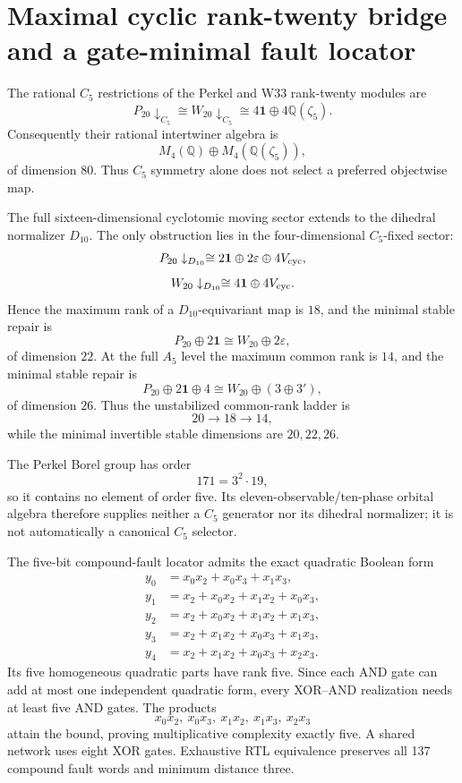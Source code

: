 \section{Maximal cyclic rank-twenty bridge and a gate-minimal fault locator}
\label{sec:bt3570-3576}

The rational $C_5$ restrictions of the Perkel and W33 rank-twenty modules are
\[
P_{20}\downarrow_{C_5}\cong W_{20}\downarrow_{C_5}
\cong4\mathbf1\oplus4\mathbb Q(\zeta_5).
\]
Consequently their rational intertwiner algebra is
\[
M_4(\mathbb Q)\oplus M_4(\mathbb Q(\zeta_5)),
\]
of dimension $80$.  Thus $C_5$ symmetry alone does not select a preferred
objectwise map.

The full sixteen-dimensional cyclotomic moving sector extends to the dihedral
normalizer $D_{10}$.  The only obstruction lies in the four-dimensional
$C_5$-fixed sector:
\[
P_{20}\downarrow_{D_{10}}\cong2\mathbf1\oplus2\varepsilon\oplus4V_{\rm cyc},
\]
\[
W_{20}\downarrow_{D_{10}}\cong4\mathbf1\oplus4V_{\rm cyc}.
\]
Hence the maximum rank of a $D_{10}$-equivariant map is $18$, and the minimal
stable repair is
\[
\boxed{P_{20}\oplus2\mathbf1\cong W_{20}\oplus2\varepsilon},
\]
of dimension $22$.  At the full $A_5$ level the maximum common rank is $14$,
and the minimal stable repair is
\[
\boxed{P_{20}\oplus2\mathbf1\oplus4
\cong W_{20}\oplus(3\oplus3')},
\]
of dimension $26$.  Thus the unstabilized common-rank ladder is
\[
20\longrightarrow18\longrightarrow14,
\]
while the minimal invertible stable dimensions are $20,22,26$.

The Perkel Borel group has order
\[
171=3^2\cdot19,
\]
so it contains no element of order five.  Its eleven-observable/ten-phase
orbital algebra therefore supplies neither a $C_5$ generator nor its dihedral
normalizer; it is not automatically a canonical $C_5$ selector.

The five-bit compound-fault locator admits the exact quadratic Boolean form
\[
\begin{aligned}
y_0&=x_0x_2+x_0x_3+x_1x_3,\\
y_1&=x_2+x_0x_2+x_1x_2+x_0x_3,\\
y_2&=x_2+x_0x_2+x_1x_2+x_1x_3,\\
y_3&=x_2+x_1x_2+x_0x_3+x_1x_3,\\
y_4&=x_2+x_1x_2+x_0x_3+x_2x_3.
\end{aligned}
\]
Its five homogeneous quadratic parts have rank five.  Since each AND gate can
add at most one independent quadratic form, every XOR--AND realization needs
at least five AND gates.  The products
\[
x_0x_2,\ x_0x_3,\ x_1x_2,\ x_1x_3,\ x_2x_3
\]
attain the bound, proving multiplicative complexity exactly five.  A shared
network uses eight XOR gates.  Exhaustive RTL equivalence preserves all 137
compound fault words and minimum distance three.
